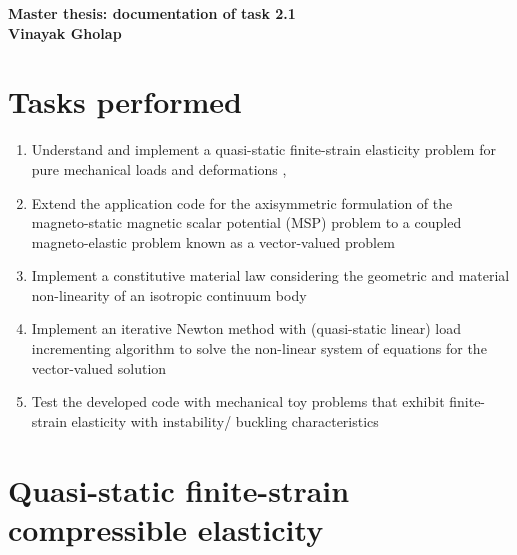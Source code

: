\documentclass[11pt,a4paper,final]{article}
\begin{document}
\begin{center}
\textbf{\Large Master thesis: documentation of task 2.1}\\ \vspace{0.25cm}
\textbf{\large Vinayak Gholap}
\end{center}

\section{Tasks performed}
\begin{enumerate}
\item Understand and implement a quasi-static finite-strain elasticity problem for pure mechanical loads and deformations \cite{Pelteret2016a}, \cite{Pelteret2012}
\item Extend the application code for the axisymmetric formulation of the magneto-static magnetic scalar potential (MSP) problem to a coupled magneto-elastic problem known as a vector-valued problem
\item Implement a constitutive material law considering the geometric and material non-linearity of an isotropic continuum body \cite{Wriggers2008}
\item Implement an iterative Newton method with (quasi-static linear) load incrementing algorithm to solve the non-linear system of equations for the vector-valued solution
\item Test the developed code with mechanical toy problems that exhibit finite-strain elasticity with instability/ buckling characteristics
\end{enumerate}

\section{Quasi-static finite-strain compressible elasticity}
\end{document}
